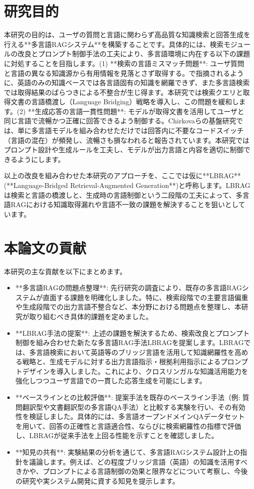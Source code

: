 \documentclass[12pt]{bxjsreport}
\begin{document}
\section{研究目的}

本研究の目的は、ユーザの質問と言語に関わらず高品質な知識検索と回答生成を行える**多言語RAGシステム**を構築することです。具体的には、検索モジュールの改良とプロンプト制御手法の工夫により、多言語環境に内在する以下の課題に対処することを目指します。(1) **検索の言語ミスマッチ問題**: ユーザ質問と言語の異なる知識源から有用情報を見落とさず取得する。で指摘されるように、英語のみの知識ベースでは各言語固有の知識を網羅できず、また多言語検索では取得結果のばらつきによる不整合が生じ得ます。本研究では検索クエリと取得文書の言語橋渡し（Language Bridging）戦略を導入し、この問題を緩和します。(2) **生成応答の言語一貫性問題**: モデルが取得文書を活用してユーザと同じ言語で流暢かつ正確に回答できるよう制御する。Chirkovaらの基盤研究では、単に多言語モデルを組み合わせただけでは回答内に不要なコードスイッチ（言語の混在）が頻発し、流暢さも損なわれると報告されています。本研究ではプロンプト設計や生成ルールを工夫し、モデルが出力言語と内容を適切に制御できるようにします。

以上の改良を組み合わせた本研究のアプローチを、ここでは仮に**LBRAG**(**Language-Bridged Retrieval-Augmented Generation**)と呼称します。LBRAGは検索と言語の橋渡しと、生成時の言語制御という二段階の工夫によって、多言語RAGにおける知識取得漏れや言語不一致の課題を解決することを狙いとしています。

\section{本論文の貢献}

本研究の主な貢献を以下にまとめます。

\begin{itemize}
\item **多言語RAGの問題点整理**: 先行研究の調査により、既存の多言語RAGシステムが直面する課題を明確化しました。特に、検索段階での主要言語偏重や生成段階での出力言語不整合など、本分野における問題点を整理し、本研究が取り組むべき具体的課題を定めました。
\item **LBRAG手法の提案**: 上述の課題を解決するため、検索改良とプロンプト制御を組み合わせた新たな多言語RAG手法LBRAGを提案します。LBRAGでは、多言語検索において英語等のブリッジ言語を活用して知識網羅性を高める戦略と、生成モデルに対する出力言語指示・根拠利用指示によるプロンプトデザインを導入しました。これにより、クロスリンガルな知識活用能力を強化しつつユーザ言語での一貫した応答生成を可能にします。
\item **ベースラインとの比較評価**: 提案手法を既存のベースライン手法（例: 質問翻訳型や文書翻訳型の多言語QA手法）と比較する実験を行い、その有効性を検証しました。具体的には、多言語オープンドメインQAデータセットを用いて、回答の正確性と言語適合性、ならびに検索網羅性の指標で評価し、LBRAGが従来手法を上回る性能を示すことを確認しました。
\item **知見の共有**: 実験結果の分析を通じて、多言語RAGシステム設計上の指針を議論します。例えば、どの程度ブリッジ言語（英語）の知識を活用すべきかや、プロンプトによる言語制御の効果と限界などについて考察し、今後の研究や実システム開発に資する知見を提示します。
\end{itemize}
\end{document}
